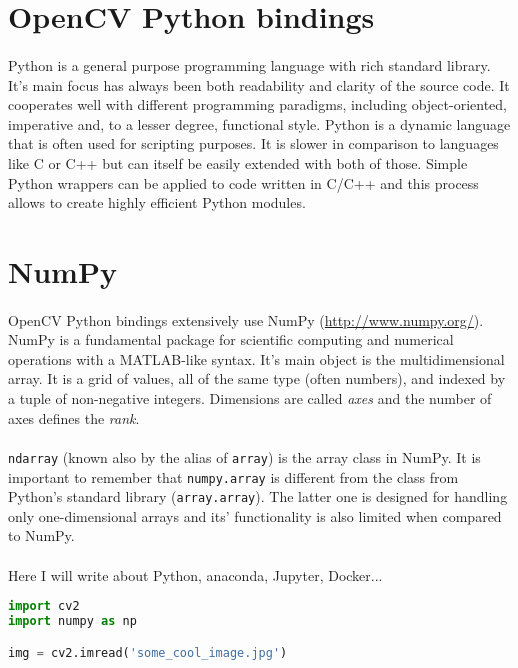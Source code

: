 \section{OpenCV Python bindings}
\paragraph{}
Python is a general purpose programming language with rich standard library. It's main focus has always been both readability and clarity of the source code. It cooperates well with different programming paradigms, including object-oriented, imperative and, to a lesser degree, functional style. Python is a dynamic language that is often used for scripting purposes. It is slower in comparison to languages like C or C++ but can itself be easily extended with both of those. Simple Python wrappers can be applied to code written in C/C++ and this process allows to create highly efficient Python modules.

\section{NumPy}
\paragraph{}
OpenCV Python bindings extensively use NumPy (\url{http://www.numpy.org/}). NumPy is a fundamental package for scientific computing and numerical operations with a MATLAB-like syntax. It's main object is the multidimensional array. It is a grid of values, all of the same type (often numbers), and indexed by a tuple of non-negative integers. Dimensions are called \textit{axes} and the number of axes defines the \textit{rank}.
\paragraph{}
\texttt{ndarray} (known also by the alias of \texttt{array}) is the array class in NumPy. It is important to remember that \texttt{numpy.array} is different from the class from Python's standard library (\texttt{array.array}). The latter one is designed for handling only one-dimensional arrays and its' functionality is also limited when compared to NumPy.

\paragraph{}
Here I will write about Python, anaconda, Jupyter, Docker...

\begin{lstlisting}[language=Python, caption=Python test code]
import cv2
import numpy as np

img = cv2.imread('some_cool_image.jpg')
\end{lstlisting}